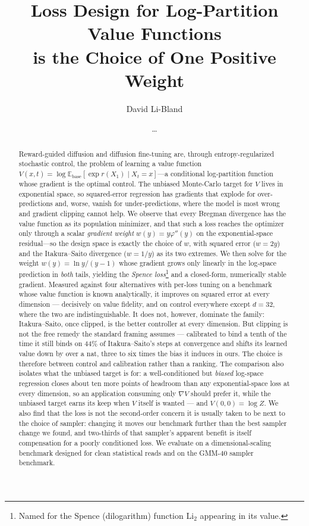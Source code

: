 \documentclass{article}
\title{Loss Design for Log-Partition Value Functions\\
       is the Choice of One Positive Weight}
\author{David Li-Bland \and \ldots}
\date{}
\theoremstyle{remark}
\theoremstyle{plain}
\newcommand{\Vf}{V}                                  %
\newcommand{\E}{\mathbb{E}}
\newcommand{\Base}{\mathrm{base}}
\newcommand{\Spence}{\mathrm{Li}_2}                  %
\begin{document}
\maketitle

\begin{abstract}
Reward-guided diffusion and diffusion fine-tuning are, through
entropy-regularized stochastic control, the problem of learning a value
function $\Vf(x,t)=\log\E_{\Base}[\exp r(X_1)\mid X_t=x]$---a conditional
log-partition function whose gradient is the optimal control. The unbiased
Monte-Carlo target for $\Vf$ lives in exponential space, so squared-error
regression has gradients that explode for over-predictions and, worse, vanish
for under-predictions, where the model is most wrong and gradient clipping
cannot help. We observe that every Bregman divergence has the value function as
its population minimizer, and that such a loss reaches the optimizer only
through a scalar \emph{gradient weight} $w(y)=y\varphi''(y)$ on the exponential-space
residual---so the design space is exactly the choice of $w$, with squared error
($w=2y$) and the Itakura--Saito divergence ($w=1/y$) as its two extremes. We
then solve for the weight $w(y)=\ln y/(y-1)$ whose gradient grows only
linearly in the log-space prediction in \emph{both} tails, yielding the
\emph{Spence loss}\footnote{Named for the Spence (dilogarithm) function
$\Spence$ appearing in its value.} and a closed-form, numerically stable
gradient. Measured against four alternatives with per-loss tuning on a benchmark whose
value function is known analytically, it improves on squared error at every
dimension --- decisively on value fidelity, and on control everywhere except
$d=32$, where the two are indistinguishable. It does not, however, dominate the family:
Itakura--Saito, once clipped, is the better controller at every dimension. But
clipping is not the free remedy the standard framing assumes --- calibrated to
bind a tenth of the time it still binds on $44\%$ of Itakura--Saito's steps at
convergence and shifts its learned value down by over a nat, three to six times
the bias it induces in ours. The choice is therefore between control and
calibration rather than a ranking. The comparison also isolates what the unbiased target is for: a
well-conditioned but \emph{biased} log-space regression closes about ten more
points of headroom than any exponential-space loss at every dimension, so an
application consuming only $\nabla \Vf$ should prefer it, while the unbiased
target earns its keep when $\Vf$ itself is wanted --- and $\Vf(0,0)=\log Z$. We also find that the loss is not the
second-order concern it is usually taken to be next to the choice of sampler:
changing it moves our benchmark further than the best sampler change we found,
and two-thirds of that sampler's apparent benefit is itself compensation for a
poorly conditioned loss. We evaluate on a dimensional-scaling benchmark designed for
clean statistical reads and on the GMM-40 sampler benchmark.
\end{abstract}
\end{document}
